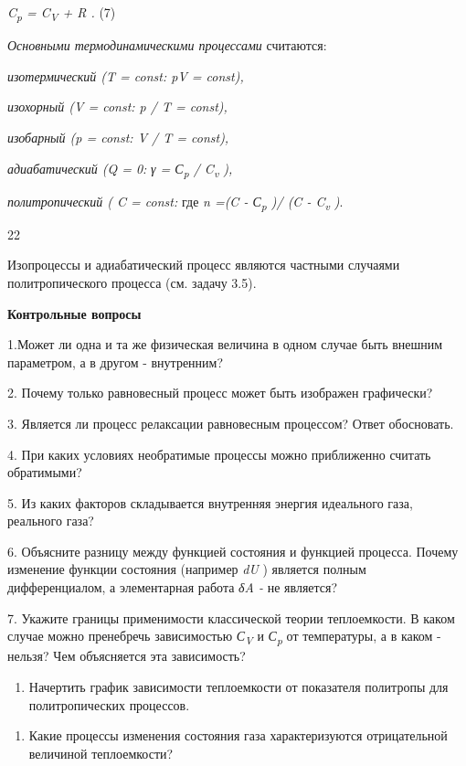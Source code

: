 \emph{C\textsubscript{p} = C\textsubscript{V} + R .} (7)

\emph{Основными термодинамическими процессами} считаются:

\emph{изотермический (T = const: pV = const),}

\emph{изохорный (V = const: p / T = const),}

\emph{изобарный (p = const: V / T = const),}

\emph{адиабатический (Q = 0:} %
\emph{γ = С\textsubscript{p} / C\textsubscript{v} ),}

\emph{политропический ( C = const:} %
где \emph{n =(C - С\textsubscript{p} )/ (C - C\textsubscript{v} )}.

22

Изопроцессы и адиабатический процесс являются частными случаями
политропического процесса (см. задачу 3.5).

\textbf{Контрольные вопросы}

1.Может ли одна и та же физическая величина в одном случае быть внешним
параметром, а в другом - внутренним?

2. Почему только равновесный процесс может быть изображен графически?

3. Является ли процесс релаксации равновесным процессом? Ответ
обосновать.

4. При каких условиях необратимые процессы можно приближенно считать
обратимыми?

5. Из каких факторов складывается внутренняя энергия идеального газа,
реального газа?

6. Объясните разницу между функцией состояния и функцией процесса.
Почему изменение функции состояния (например \emph{dU} ) является полным
дифференциалом, а элементарная работа \emph{δA -} не является?

7. Укажите границы применимости классической теории теплоемкости. В
каком случае можно пренебречь зависимостью \emph{С\textsubscript{V}} и
\emph{С\textsubscript{p}} от температуры, а в каком - нельзя? Чем
объясняется эта зависимость?

\begin{enumerate}
\def\labelenumi{\arabic{enumi}.}
\setcounter{enumi}{7}
\item
  Начертить график зависимости теплоемкости от показателя политропы для
  политропических процессов.
\end{enumerate}

\begin{enumerate}
\def\labelenumi{\arabic{enumi}.}
\setcounter{enumi}{7}
\item
  Какие процессы изменения состояния газа характеризуются отрицательной
  величиной теплоемкости?
\end{enumerate}


